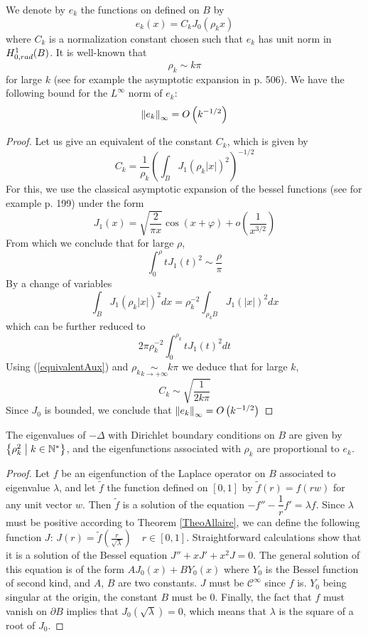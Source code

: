 \documentclass[11pt,a4paper]{article}
\begin{document}
\begin{Def} \label{DefEK} We denote by $e_{k}$ the functions on defined on $B$ by \[e_{k}(x) = C_{k} J_0(\rho_kx)\] where $C_{k}$ is a normalization constant chosen such that $e_{k}$ has unit norm in $H^1_{0,rad}(B)$. It is well-known that \[\rho_{k} \sim k\pi \] for large $k$ (see for example the asymptotic expansion in \cite{watson1995treatise} p. 506). We have the following bound for the $L^\infty$ norm of $e_{k}$:  \[ \left\|e_{k}\right\|_{\infty} = O\left(k^{-1/2}\right)\] 

\begin{proof}
Let us give an equivalent of the constant $C_{k}$, which is given by 
\[C_{k} = \frac{1}{\rho_k} \left(\int_{B} J_1(\rho_k |x|)^2\right)^{-1/2} \]
For this, we use the classical asymptotic expansion of the bessel functions  (see for example \cite{watson1995treatise} p. 199) under the form 
\[ J_1(x) = \sqrt{\dfrac{2}{\pi x}} \cos(x + \varphi) + o\left(\dfrac{1}{x^{3/2}}\right)\]
From which we conclude that for large $\rho$, 
\begin{equation}
\int_{0}^\rho t J_1(t)^2 \sim \dfrac{\rho}{\pi}
\label{equivalentAux}
\end{equation}
By a change of variables \[ \int_{B} J_1(\rho_k|x|)^2dx =   \rho_k^{-2}\int_{\rho_{k}B} J_1(|x|)^2dx\]
which can be further reduced to 
\[ 2\pi \rho_{k}^{-2} \int_{0}^{\rho_{k}} t J_1(t)^2dt\]
Using (\ref{equivalentAux}) and $\rho_{k} \underset{k\to +\infty}{\sim }k\pi$ we deduce that for large $k$, \[C_{k} \sim \sqrt{\dfrac{1}{2k\pi}} \]
Since $J_0$ is bounded, we conclude that $\left\|e_{k}\right\|_{\infty} = O\left(k^{-1/2}\right)$
\end{proof}
\end{Def}

\begin{Prop} The eigenvalues of $-\Delta$ with Dirichlet boundary conditions on $B$ are given by $\left\{\rho_{k}^2\mathrel{}\middle|\mathrel{}k\in \mathbb{N}^*\right\}$, and the eigenfunctions associated with $\rho_{k}$ are proportional to $e_{k}$. 
\begin{proof}
Let $f$ be an eigenfunction of the Laplace operator on $B$ associated to eigenvalue $\lambda$, and let $\tilde{f}$ the function defined on $[0,1]$ by $\tilde{f}(r) = f(rw)$ for any unit vector $w$. Then $\tilde{f}$ is a solution of the equation $- f'' - \dfrac{1}{r}f' = \lambda f$. Since $\lambda$ must be positive according to Theorem \ref{TheoAllaire}, we can define the following function $J$: $J(r) = \tilde{f}\left(\frac{r}{\sqrt{\lambda}}\right)\quad r\in[0,1]$. Straightforward calculations show that it is a solution of the Bessel equation $J'' + xJ' + x^2J = 0$. The general solution of this equation is of the form $A J_0(x) + B Y_0(x)$ where $Y_0$ is the Bessel function of second kind, and $A$, $B$ are two constants. $J$ must be $\mathcal{C^\infty}$ since $f$ is. $Y_{0}$ being singular at the origin, the constant $B$ must be $0$. Finally, the fact that $f$ must vanish on $\partial B$ implies that $J_0(\sqrt{\lambda}) =0$, which means that $\lambda$ is the square of a root of $J_0$. 
\end{proof}
\end{Prop}
\end{document}
